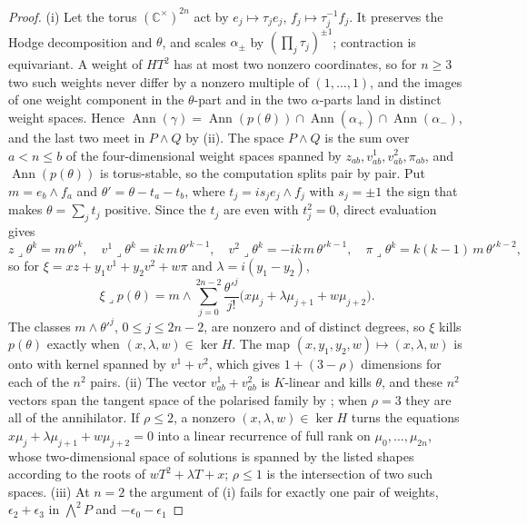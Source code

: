 \documentclass[11pt,reqno]{amsart}
\theoremstyle{plain}
\theoremstyle{definition}
\theoremstyle{remark}
\newcommand{\CC}{\mathbb{C}}
\DeclareMathOperator{\Ann}{Ann}
\begin{document}
\begin{proof}
(i) Let the torus $(\CC^{\times})^{2n}$ act by $e_{j}\mapsto\tau_{j}e_{j}$,
$f_{j}\mapsto\tau_{j}^{-1}f_{j}$. It preserves the Hodge decomposition and
$\theta$, and scales $\alpha_{\pm}$ by $(\prod_{j}\tau_{j})^{\pm1}$;
contraction is equivariant. A weight of $HT^{2}$ has at most two nonzero
coordinates, so for $n\ge3$ two such weights never differ by a nonzero
multiple of $(1,\dots,1)$, and the images of one weight component in the
$\theta$-part and in the two $\alpha$-parts land in distinct weight spaces.
Hence $\Ann(\gamma)=\Ann(p(\theta))\cap\Ann(\alpha_{+})\cap\Ann(\alpha_{-})$,
and the last two meet in $P\wedge Q$ by (ii). The space
$P\wedge Q$ is the sum over $a<n\le b$ of the four-dimensional weight spaces
spanned by $z_{ab},v^{1}_{ab},v^{2}_{ab},\pi_{ab}$, and $\Ann(p(\theta))$ is
torus-stable, so the computation splits pair by pair. Put
$m=e_{b}\wedge f_{a}$ and $\theta'=\theta-t_{a}-t_{b}$, where
$t_{j}=i s_{j}e_{j}\wedge f_{j}$ with $s_{j}=\pm1$ the sign that makes
$\theta=\sum_{j}t_{j}$ positive. Since the $t_{j}$ are even with
$t_{j}^{2}=0$, direct evaluation gives
\[
  z\lrcorner\theta^{k}=m\,\theta'^{k},\quad
  v^{1}\lrcorner\theta^{k}=ik\,m\,\theta'^{k-1},\quad
  v^{2}\lrcorner\theta^{k}=-ik\,m\,\theta'^{k-1},\quad
  \pi\lrcorner\theta^{k}=k(k-1)\,m\,\theta'^{k-2},
\]
so for $\xi=xz+y_{1}v^{1}+y_{2}v^{2}+w\pi$ and $\lambda=i(y_{1}-y_{2})$,
\[
  \xi\lrcorner p(\theta)=m\wedge\sum_{j=0}^{2n-2}\frac{\theta'^{j}}{j!}
  \bigl(x\mu_{j}+\lambda\mu_{j+1}+w\mu_{j+2}\bigr).
\]
The classes $m\wedge\theta'^{j}$, $0\le j\le2n-2$, are nonzero and of distinct
degrees, so $\xi$ kills $p(\theta)$ exactly when $(x,\lambda,w)\in\ker H$.
The map $(x,y_{1},y_{2},w)\mapsto(x,\lambda,w)$ is onto with kernel spanned by
$v^{1}+v^{2}$, which gives $1+(3-\rho)$ dimensions for each of the $n^{2}$
pairs. (ii) The vector $v^{1}_{ab}+v^{2}_{ab}$ is $K$-linear and kills
$\theta$, and these $n^{2}$ vectors span the tangent space of the polarised
family by \cite[Proposition~9.14]{paperI}; when $\rho=3$ they are all of the
annihilator. If $\rho\le2$, a nonzero $(x,\lambda,w)\in\ker H$ turns the
equations $x\mu_{j}+\lambda\mu_{j+1}+w\mu_{j+2}=0$ into a linear recurrence of
full rank on $\mu_{0},\dots,\mu_{2n}$, whose two-dimensional space of
solutions is spanned by the listed shapes according to the roots of
$wT^{2}+\lambda T+x$; $\rho\le1$ is the intersection of two such spaces.
(iii) At $n=2$ the argument of (i) fails for exactly one pair of weights,
$\epsilon_{2}+\epsilon_{3}$ in $\bigwedge^{2}P$ and $-\epsilon_{0}-\epsilon_{1}$

\end{proof}
\end{document}
